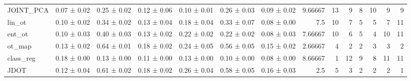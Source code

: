 \begin{tabular}{lllllllrrrrrrr}
 JOINT\_PCA & 0.07 ± 0.02     & 0.25 ± 0.02     & 0.12 ± 0.06     & 0.10 ± 0.01    & 0.26 ± 0.03     & 0.09 ± 0.02    &       9.66667 &                   13 &                    9 &                    8 &                  10 &                    9 &                   9 \\
 lin\_ot    & 0.10 ± 0.02     & 0.34 ± 0.02     & 0.13 ± 0.04     & 0.18 ± 0.04    & 0.33 ± 0.07     & 0.08 ± 0.00    &       7.5     &                   10 &                    7 &                    5 &                   5 &                    7 &                  11 \\
 ent\_ot    & 0.10 ± 0.03     & 0.40 ± 0.03     & 0.13 ± 0.02     & 0.22 ± 0.02    & 0.22 ± 0.02     & 0.08 ± 0.03    &       7.66667 &                   10 &                    6 &                    5 &                   4 &                   10 &                  11 \\
 ot\_map    & 0.13 ± 0.02     & 0.64 ± 0.01     & 0.18 ± 0.02     & 0.24 ± 0.05    & 0.56 ± 0.05     & 0.15 ± 0.02    &       2.66667 &                    4 &                    2 &                    2 &                   3 &                    3 &                   2 \\
 class\_reg & 0.18 ± 0.00     & 0.13 ± 0.00     & 0.11 ± 0.00     & 0.13 ± 0.00    & 0.10 ± 0.00     & 0.08 ± 0.00    &       8.66667 &                    1 &                   12 &                    9 &                   8 &                   11 &                  11 \\
 JDOT      & 0.12 ± 0.04     & 0.61 ± 0.02     & 0.18 ± 0.02     & 0.26 ± 0.04    & 0.58 ± 0.05     & 0.16 ± 0.03    &       2.5     &                    5 &                    3 &                    2 &                   2 &                    2 &                   1 \\
\hline
\end{tabular}